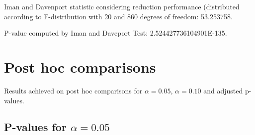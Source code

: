 \documentclass[a4paper,10pt]{article}
\begin{document}
\begin{landscape}
Iman and Davenport statistic considering reduction performance (distributed according to F-distribution with 20 and 860 degrees of freedom: 53.253758.

P-value computed by Iman and Daveport Test: 2.524427736104901E-135.\newline



\pagebreak

\section{Post hoc comparisons}

Results achieved on post hoc comparisons for $\alpha = 0.05$, $\alpha = 0.10$ and adjusted p-values.

\subsection{P-values for $\alpha=0.05$}


\end{landscape}
\end{document}
